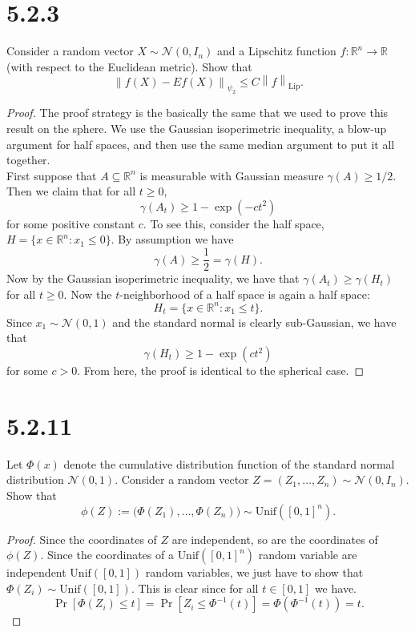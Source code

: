 \documentclass[11pt,letterpaper]{report}
\newcommand{\reals}{\mathbb{R}}
\newcommand{\mcal}[1]{\mathcal{#1}}
\newcommand{\subg}[1]{\left\|{#1}\right\|_{\psi_2}}
\newcommand{\Lip}[1]{\left\|{#1}\right\|_{\text{Lip}}}
\newcommand{\Unif}{\text{Unif}}
\begin{document}
\section*{5.2.3}
Consider a random vector $X\sim \mcal{N}(0, I_n)$ and a Lipschitz function $f:\reals^n\to \reals$ (with respect to the Euclidean metric). Show that
\[
\subg{f(X)-E f(X)} \leq C\Lip{f}.
\]
\begin{proof}
	The proof strategy is the basically the same that we used to prove this result on the sphere. We use the Gaussian isoperimetric inequality, a blow-up argument for half spaces, and then use the same median argument to put it all together.\\

	\noindent First suppose that $A\subseteq \reals^n$ is measurable with Gaussian measure $\gamma(A)\geq 1/2$. Then we claim that for all $t\geq 0$,
	\[
	\gamma(A_t) \geq 1-\exp(-ct^2)
	\]
	for some positive constant $c$. To see this, consider the half space, $H = \{x\in \reals^n: x_1\leq 0\}$. By assumption we have
	\[
	\gamma(A) \geq \frac 12 = \gamma(H).
	\]
	Now by the Gaussian isoperimetric inequality, we have that $\gamma(A_t) \geq \gamma(H_t)$ for all $t\geq 0$. Now the $t$-neighborhood of a half space is again a half space:
	\[
	H_t = \{x\in \reals^n: x_1 \leq t\}.
	\]
	Since $x_1 \sim \mcal{N}(0, 1)$ and the standard normal is clearly sub-Gaussian, we have that
	\[
	\gamma(H_t) \geq 1-\exp(ct^2)
	\]
	for some $c>0$. From here, the proof is identical to the spherical case.
\end{proof}










\section*{5.2.11}
Let $\Phi(x)$ denote the cumulative distribution function of the standard normal distribution $\mcal{N}(0,1)$. Consider a random vector $Z = (Z_1, \ldots, Z_n)\sim \mcal{N}(0, I_n)$. Show that
\[
\phi(Z):= \big(\Phi(Z_1), \ldots, \Phi(Z_n)\big)\sim \text{Unif}([0,1]^n).
\]
\begin{proof}
	Since the coordinates of $Z$ are independent, so are the coordinates of $\phi(Z)$. Since the coordinates of a $\Unif([0,1]^n)$ random variable are independent $\Unif([0,1])$ random variables, we just have to show that $\Phi(Z_i)\sim \Unif([0,1])$. This is clear since for all $t\in [0,1]$ we have.
	\[
	\Pr[\Phi(Z_i)\leq t] = \Pr[Z_i\leq \Phi^{-1}(t)] = \Phi(\Phi^{-1}(t)) = t.
	\]
\end{proof}
\end{document}

